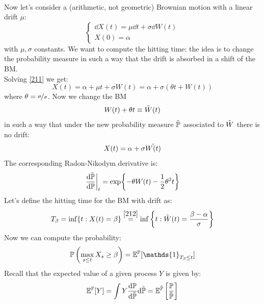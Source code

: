 \\ Now let's consider a (arithmetic, not geometric) Brownian motion with a linear drift $\mu$:
\begin{equation}\label{211}
    \begin{cases}
    \dd X(t) = \mu\dd t + \sigma\dd W(t) \\
    X(0) = \alpha
    \end{cases}
\end{equation}
with $\mu,\sigma$ constants. We want to compute the hitting time: the idea is to change the probability measure in such a way that the drift is absorbed in a shift of the BM. \\
Solving \eqref{211} we get:
\begin{equation}
    X(t) = \alpha + \mu t + \sigma W(t) = \alpha + \sigma\left(\theta t + W(t)\right)
\end{equation}
where $\theta = \nicefrac{\mu}{\sigma}$. Now we change the BM
\begin{equation}\label{ww}
    W(t)+\theta t \equiv \Tilde{W}(t)
\end{equation}
in such a way that under the new probability measure $\Tilde{\mathbb{P}}$ associated to $\Tilde{W}$ there is no drift:
\begin{equation}\label{212}
    X(t) = \alpha + \sigma\Tilde{W(t)}
\end{equation}
The corresponding Radon-Nikodym derivative is:
\begin{equation} %
    \eval{\frac{\dd\Tilde{\Pmeas}}{\dd\Pmeas}}_t = \exp{-\theta W(t) - \frac{1}{2}\theta^2 t}
\end{equation}
Let's define the hitting time for the BM with drift as:
\begin{equation}
    T_{\beta} = \inf\{t:X(t)=\beta\} \overset{\eqref{212}}{=} \inf\bigg\{t: \Tilde{W}(t) = \frac{\beta-\alpha}{\sigma}\bigg\}
\end{equation}
Now we can compute the probability:
\begin{align}\label{213}
    \Pmeas\left(\max_{s\le t}X_s \ge \beta\right) = \mathbb{E}^{\Pmeas}[\mathds{1}_{T_{\beta}\le t}]
\end{align}
Recall that the expected value of a given process $Y$ is given by:
\begin{equation*}
    \mathbb{E}^{\mathbb{P}}[Y] = \int Y \dfrac{\dd\mathbb{P}}{\dd\Tilde{\mathbb{P}}}\dd\Tilde{\mathbb{P}} = \mathbb{E}^{\Tilde{\mathbb{P}}}\left[\frac{\mathbb{P}}{\Tilde{\mathbb{P}}}\right]
\end{equation*}
